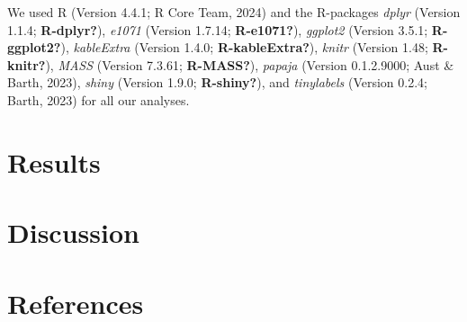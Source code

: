 \documentclass[
  man]{apa7}
\begin{document}
We used R (Version 4.4.1; R Core Team, 2024) and the R-packages \emph{dplyr} (Version 1.1.4; \textbf{R-dplyr?}), \emph{e1071} (Version 1.7.14; \textbf{R-e1071?}), \emph{ggplot2} (Version 3.5.1; \textbf{R-ggplot2?}), \emph{kableExtra} (Version 1.4.0; \textbf{R-kableExtra?}), \emph{knitr} (Version 1.48; \textbf{R-knitr?}), \emph{MASS} (Version 7.3.61; \textbf{R-MASS?}), \emph{papaja} (Version 0.1.2.9000; Aust \& Barth, 2023), \emph{shiny} (Version 1.9.0; \textbf{R-shiny?}), and \emph{tinylabels} (Version 0.2.4; Barth, 2023) for all our analyses.

\section{Results}\label{results}

\section{Discussion}\label{discussion}

\newpage

\section{References}\label{references}
\end{document}
